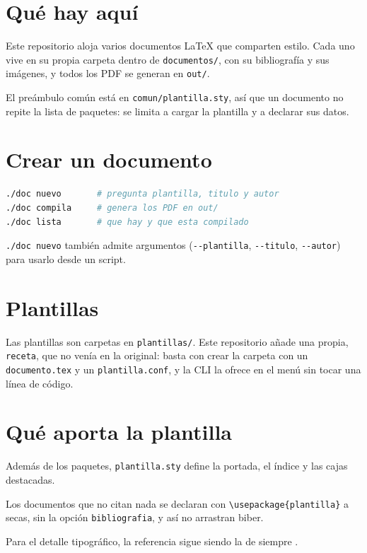 \documentclass[a4paper,12pt]{article}
\begin{document}
\portada
\indice

\section{Qué hay aquí}

Este repositorio aloja varios documentos LaTeX que comparten estilo. Cada uno
vive en su propia carpeta dentro de \texttt{documentos/}, con su bibliografía y
sus imágenes, y todos los PDF se generan en \texttt{out/}.

El preámbulo común está en \texttt{comun/plantilla.sty}, así que un documento
no repite la lista de paquetes: se limita a cargar la plantilla y a declarar
sus datos.

\section{Crear un documento}

\begin{lstlisting}[language=bash,caption={Crear y compilar}]
./doc nuevo       # pregunta plantilla, titulo y autor
./doc compila     # genera los PDF en out/
./doc lista       # que hay y que esta compilado
\end{lstlisting}

\begin{nota}
    \texttt{./doc nuevo} también admite argumentos
    (\texttt{-{}-plantilla}, \texttt{-{}-titulo}, \texttt{-{}-autor}) para
    usarlo desde un script.
\end{nota}

\section{Plantillas}

Las plantillas son carpetas en \texttt{plantillas/}. Este repositorio añade una
propia, \texttt{receta}, que no venía en la original: basta con crear la carpeta
con un \texttt{documento.tex} y un \texttt{plantilla.conf}, y la CLI la ofrece
en el menú sin tocar una línea de código.

\section{Qué aporta la plantilla}

Además de los paquetes, \texttt{plantilla.sty} define la portada, el índice y
las cajas destacadas.

\begin{aviso}
    Los documentos que no citan nada se declaran con
    \texttt{\textbackslash usepackage\{plantilla\}} a secas, sin la opción
    \texttt{bibliografia}, y así no arrastran biber.
\end{aviso}

Para el detalle tipográfico, la referencia sigue siendo la de siempre
\cite{knuth1984}.

\printbibliography
\end{document}
